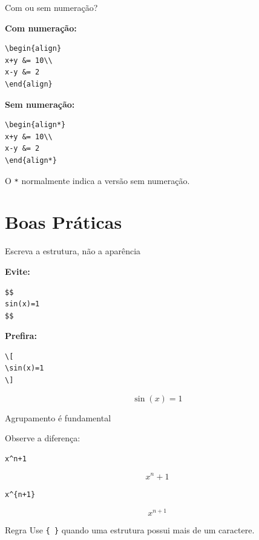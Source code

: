 \documentclass[aspectratio=169,xcolor=dvipsnames]{beamer}
\begin{document}
\begin{frame}[fragile]{Com ou sem numeração?}

    \textbf{Com numeração:}

\begin{lstlisting}
\begin{align}
x+y &= 10\\
x-y &= 2
\end{align}
\end{lstlisting}

    \textbf{Sem numeração:}

\begin{lstlisting}
\begin{align*}
x+y &= 10\\
x-y &= 2
\end{align*}
\end{lstlisting}

    \begin{center}
        O \texttt{*} normalmente indica a versão sem numeração.
    \end{center}

\end{frame}


\section{Boas Práticas}

\begin{frame}[fragile]{Escreva a estrutura, não a aparência}

    \textbf{Evite:}

\begin{lstlisting}
$$
sin(x)=1
$$
\end{lstlisting}

    \textbf{Prefira:}

\begin{lstlisting}
\[
\sin(x)=1
\]
\end{lstlisting}

    \[
        \sin(x)=1
    \]

\end{frame}

\begin{frame}[fragile]{Agrupamento é fundamental}

    Observe a diferença:

\begin{lstlisting}
x^n+1
\end{lstlisting}

    \[
        x^n+1
    \]

\begin{lstlisting}
x^{n+1}
\end{lstlisting}

    \[
        x^{n+1}
    \]

    \begin{alertblock}{Regra}
        Use \texttt{\{ \}} quando uma estrutura possui mais de um caractere.
    \end{alertblock}

\end{frame}
\end{document}
